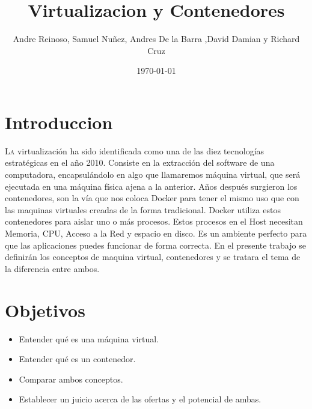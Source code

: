 \documentclass[twoside,twocolumn]{article}
\title{Virtualizacion y Contenedores} %
\author{Andre Reinoso, Samuel Nuñez, Andres De la Barra ,David Damian y Richard Cruz}
\date{\today} %
\begin{document}
\maketitle


\section{Introduccion}

\lettrine[nindent=0em,lines=3]{L}a virtualización ha sido identificada como una de las diez tecnologías estratégicas en el año 2010. Consiste en la extracción del software de una computadora, encapsulándolo en algo que llamaremos máquina virtual, que será ejecutada en una máquina física ajena a la anterior.
Años después surgieron los contenedores, son la vía que nos coloca Docker para tener el mismo uso que con las maquinas virtuales creadas de la forma tradicional. Docker utiliza estos contenedores para aislar uno o más procesos. Estos procesos en el Host necesitan Memoria, CPU, Acceso a la Red y espacio en disco. Es un ambiente perfecto para que las aplicaciones puedes funcionar de forma correcta.
En el presente trabajo se definirán los conceptos de maquina virtual, contenedores y se tratara el tema de la diferencia entre ambos.




\section{Objetivos}

\begin{itemize}
\item Entender qué es una máquina virtual.
\item Entender qué es un contenedor.
\item Comparar ambos conceptos.
\item Establecer un juicio acerca de las ofertas y el potencial de ambas.

\end{itemize}




\end{document}
